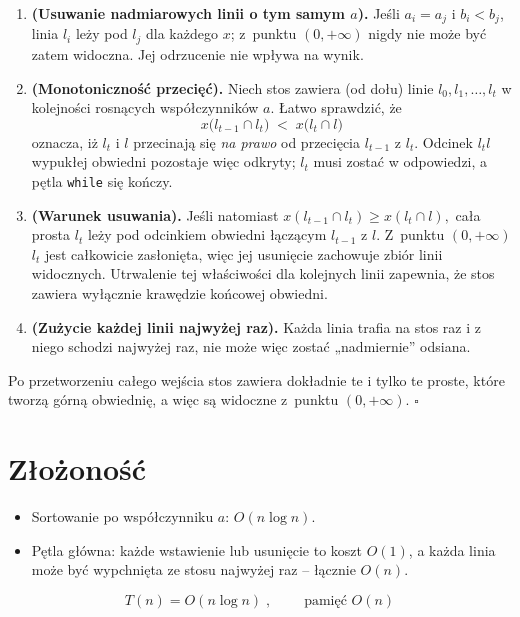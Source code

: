 \documentclass[11pt,a4paper]{article}
\begin{document}
\begin{enumerate}
\item \textbf{(Usuwanie nadmiarowych linii o tym samym $a$).}  
      Jeśli $a_i=a_j$ i $b_i<b_j$, linia $l_i$ leży pod $l_j$ dla
      każdego $x$; z~punktu $(0,+\infty)$ nigdy nie może być zatem
      widoczna.  Jej odrzucenie nie wpływa na wynik.

\item \textbf{(Monotoniczność przecięć).}  
      Niech stos zawiera (od dołu) linie
      $l_0,l_1,\dots,l_t$ w kolejności rosnących współczynników $a$.  
      Łatwo sprawdzić, że
      \[
        x\bigl(l_{t-1}\!\cap l_t\bigr)
        \;<\;
        x\bigl(l_{t}\!\cap l\bigr)
      \]
      oznacza, iż $l_t$ i $l$ przecinają się \emph{na prawo} od
      przecięcia $l_{t-1}$ z $l_t$.  
      Odcinek $l_tl$ wypukłej obwiedni pozostaje więc odkryty; $l_t$
      musi zostać w odpowiedzi, a pętla \texttt{while} się kończy.

\item \textbf{(Warunek usuwania).}  
      Jeśli natomiast
      $
        x(l_{t-1}\!\cap l_t)
        \ge
        x(l_t\!\cap l),
      $
      cała prosta $l_t$ leży pod odcinkiem obwiedni
      łączącym $l_{t-1}$ z $l$.  
      Z~punktu $(0,+\infty)$ $l_t$ jest całkowicie zasłonięta,
      więc jej usunięcie zachowuje zbiór linii widocznych.
      Utrwalenie tej właściwości dla kolejnych
      linii zapewnia, że stos zawiera
      wyłącznie krawędzie końcowej obwiedni.

\item \textbf{(Zużycie każdej linii najwyżej raz).}  
      Każda linia trafia na stos raz
      i z niego schodzi najwyżej raz,
      nie może więc zostać „nadmiernie” odsiana.
\end{enumerate}

Po przetworzeniu całego wejścia
stos zawiera dokładnie te i tylko te proste,
które tworzą górną obwiednię,
a więc są widoczne z~punktu $(0,+\infty)$.
\hfill$\square$


\section*{Złożoność}

\begin{itemize}
\item
Sortowanie po współczynniku $a$: \;\;$O(n\log n)$.
\item
Pętla główna: każde wstawienie lub usunięcie
to koszt $O(1)$, a każda linia
może być wypchnięta ze stosu najwyżej raz –
łącznie $O(n)$.
\end{itemize}

\[
\boxed{\;T(n)=O(n\log n)\;}, \qquad
\boxed{\;\text{pamięć } O(n)\;}
\]
\end{document}
